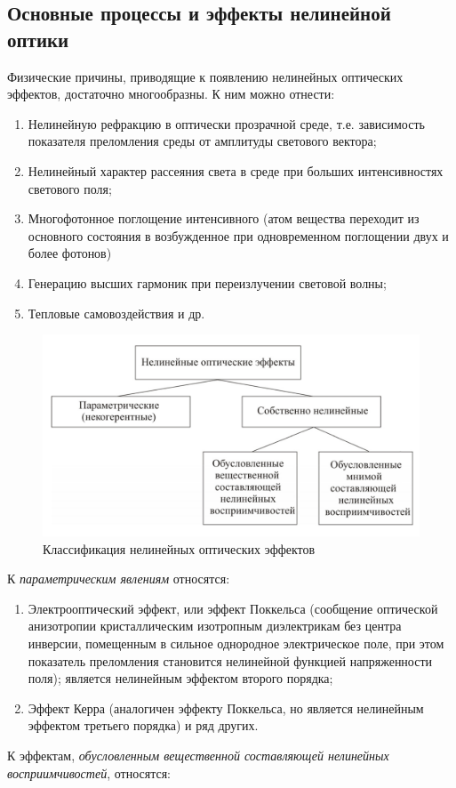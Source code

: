 \subsection{Основные процессы и эффекты нелинейной оптики}
Физические причины, приводящие к появлению нелинейных оптических эффектов, достаточно многообразны. К ним можно отнести:
\begin{enumerate}
\item  Нелинейную рефракцию в оптически прозрачной среде, т.е. зависимость показателя преломления среды от амплитуды светового вектора;
\item  Нелинейный характер рассеяния света в среде при больших интенсивностях светового поля;
\item  Многофотонное поглощение интенсивного (атом вещества переходит из основного состояния в возбужденное при одновременном поглощении двух и более фотонов)
\item  Генерацию высших гармоник при переизлучении световой волны;
\item  Тепловые самовоздействия и др.
\end{enumerate}
\begin{figure}[h]
	\centering
	\includegraphics[width=0.7\linewidth]{images/classific.png}
	\caption{Классификация нелинейных оптических эффектов}
	\label{classific}
\end{figure}
К \textit{параметрическим явлениям} относятся:
\begin{enumerate}
\item   Электрооптический эффект, или эффект Поккельса (сообщение оптической анизотропии кристаллическим изотропным диэлектрикам без центра инверсии, помещенным в сильное однородное электрическое поле, при этом показатель преломления становится нелинейной функцией напряженности поля); является нелинейным эффектом второго порядка;
\item Эффект Керра (аналогичен эффекту Поккельса, но является нелинейным эффектом третьего порядка) и ряд других.
\end{enumerate}
К эффектам, \textit{обусловленным вещественной составляющей нелинейных восприимчивостей}, относятся:

